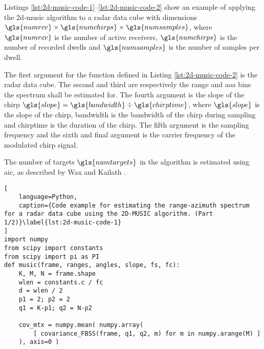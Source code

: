 Listings \ref{lst:2d-music-code-1}--\ref{lst:2d-music-code-2} show an example of applying the \gls{2d-music} algorithm to a radar data cube
with dimensions $\gls{numrcv} \times \gls{numchirps} \times \gls{numsamples}$, where $\gls{numrcv}$ is the number of active receivers, 
$\gls{numchirps}$ is the number of recorded dwells and $\gls{numsamples}$ is the number of samples per dwell.

The first argument for the function defined in Listing \ref{lst:2d-music-code-2} is the radar data cube.
The second and third are respectively the range and \gls{aoa} bins the spectrum shall be estimated for.
The fourth argument is the slope of the chirp $\gls{slope} = \gls{bandwidth} \div \gls{chirptime}$, where $\gls{slope}$ is the slope of the chirp,
\gls{bandwidth} is the bandwidth of the chirp during sampling and \gls{chirptime} is the duration of the chirp.
The fifth argument is the sampling frequency and the sixth and final argument is the carrier frequency of the modulated chirp signal.

The number of targets $\gls{numtargets}$ in the algorithm is estimated using \gls{aic}, as described by Wax and Kailath \cite{wax-kailath-85}.

\begin{lstlisting}[
    language=Python,
    caption={Code example for estimating the range-azimuth spectrum for a radar data cube using the 2D-MUSIC algorithm. (Part 1/2)}\label{lst:2d-music-code-1}
]
import numpy
from scipy import constants
from scipy import pi as PI
def music(frame, ranges, angles, slope, fs, fc):
    K, M, N = frame.shape
    wlen = constants.c / fc
    d = wlen / 2
    p1 = 2; p2 = 2
    q1 = K-p1; q2 = N-p2

    cov_mtx = numpy.mean( numpy.array(
        [ covariance_FBSS(frame, q1, q2, m) for m in numpy.arange(M) ]
    ), axis=0 )
\end{lstlisting}
\newpage

